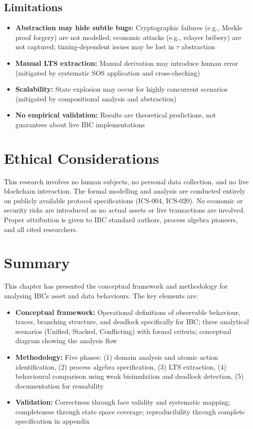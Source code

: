 \subsection{Limitations}\label{limitations}

\begin{itemize}
    \item \textbf{Abstraction may hide subtle bugs:} Cryptographic failures (e.g., Merkle proof forgery) are not modelled; economic attacks (e.g., relayer bribery) are not captured; timing-dependent issues may be lost in \(\tau\) abstraction
    \item \textbf{Manual LTS extraction:} Manual derivation may introduce human error (mitigated by systematic SOS application and cross-checking)
    \item \textbf{Scalability:} State explosion may occur for highly concurrent scenarios (mitigated by compositional analysis and abstraction)
    \item \textbf{No empirical validation:} Results are theoretical predictions, not guarantees about live IBC implementations
\end{itemize}

\section{Ethical Considerations}\label{ethical-considerations}

This research involves no human subjects, no personal data collection,
and no live blockchain interaction. The formal modelling and analysis
are conducted entirely on publicly available protocol specifications
(ICS-004, ICS-020). No economic or security risks are introduced as no
actual assets or live transactions are involved. Proper attribution is
given to IBC standard authors, process algebra pioneers, and all cited
researchers.

\section{Summary}\label{summary}

This chapter has presented the conceptual framework and methodology for
analysing IBC\textquotesingle s asset and data behaviours. The key
elements are:

\begin{itemize}
    \item \textbf{Conceptual framework:} Operational definitions of observable behaviour, traces, branching structure, and deadlock specifically for IBC; three analytical scenarios (Unified, Stacked, Conflicting) with formal criteria; conceptual diagram showing the analysis flow
    \item \textbf{Methodology:} Five phases: (1) domain analysis and atomic action identification, (2) process algebra specification, (3) LTS extraction, (4) behavioural comparison using weak bisimulation and deadlock detection, (5) documentation for reusability
    \item \textbf{Validation:} Correctness through face validity and systematic mapping; completeness through state space coverage; reproducibility through complete specification in appendix
\end{itemize}
